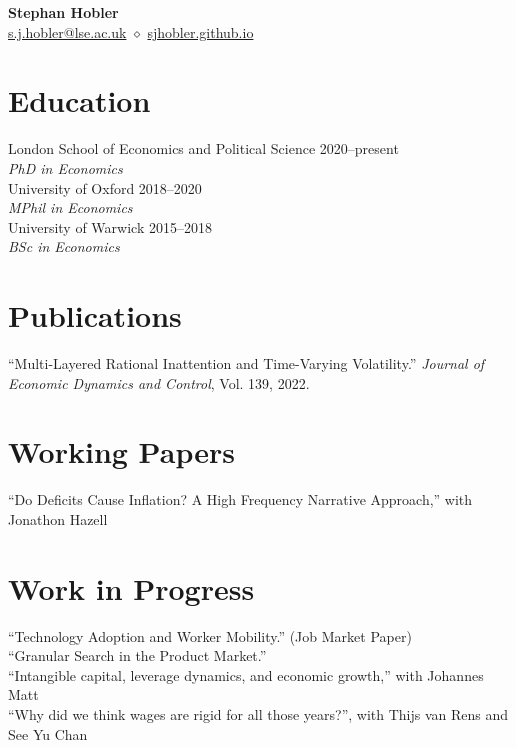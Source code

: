\documentclass[10pt,a4paper]{article}
\newcommand{\cventry}[3]{%
  #1 \hfill #2\\
  \textit{#3} \hfill \\ [-0.3em]
}
\newcommand{\publication}[1]{%
  #1\\[0.4em]
}
\begin{document}
\begin{center}
{\LARGE \textbf{Stephan Hobler}}\\[0.8em]
\href{mailto:s.j.hobler@lse.ac.uk}{s.j.hobler@lse.ac.uk} \qquad $\diamond$ \qquad \href{https://sjhobler.github.io/}{sjhobler.github.io}
\end{center}

\section{Education}
\cventry{London School of Economics and Political Science}{2020--present}
{PhD in Economics}

\cventry{University of Oxford}{2018--2020}
{MPhil in Economics}

\cventry{University of Warwick}{2015--2018}
{BSc in Economics}


\vspace{-0.5em}
\section{Publications}
\publication{``Multi-Layered Rational Inattention and Time-Varying Volatility.'' \textit{Journal of Economic Dynamics and Control}, Vol. 139, 2022.}

\vspace{-0.5em}
\section{Working Papers}
\publication{``Do Deficits Cause Inflation? A High Frequency Narrative Approach,'' with Jonathon Hazell}

\vspace{-0.5em}
\section{Work in Progress}
\publication{``Technology Adoption and Worker Mobility.'' (Job Market Paper)}
\publication{``Granular Search in the Product Market.''}
\publication{``Intangible capital, leverage dynamics, and economic growth,'' with Johannes Matt}
\publication{``Why did we think wages are rigid for all those years?'', with Thijs van Rens and See Yu Chan}

\end{document}
